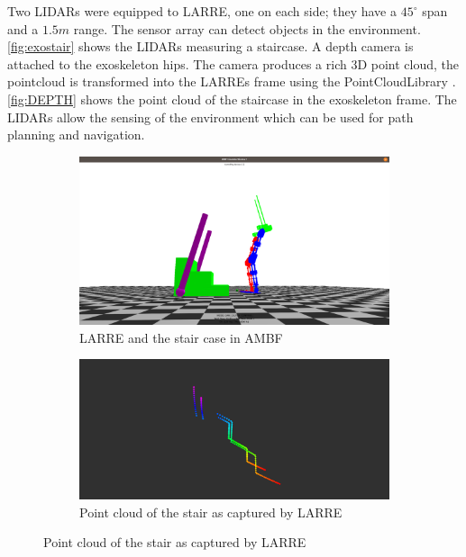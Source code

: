  
 Two LIDARs were equipped to LARRE, one on each side; they have a $45^{\circ}$ span and a $1.5m$ range. The sensor array can detect objects in the environment. \autoref{fig:exostair} shows the LIDARs measuring a staircase. A depth camera is attached to the exoskeleton hips. The camera produces a rich 3D point cloud, the pointcloud is transformed into the LARREs frame using the PointCloudLibrary \cite{Rusu_ICRA2011_PCL}.  \autoref{fig:DEPTH} shows the point cloud of the staircase in the exoskeleton frame. The LIDARs allow the sensing of the environment which can be used for path planning and navigation. 

 \begin{figure}[h]
    \begin{subfigure}{.5\linewidth}
        \centering
        \includegraphics[scale=0.1]{images/sim/stair2.png}
        \caption{LARRE and the stair case in AMBF}
        \label{fig:exostair}
        \label{fig:sub1}
    \end{subfigure}%
    \begin{subfigure}{.5\linewidth}
       \centering
        \includegraphics[scale=0.15]{images/sim/point_cloud_stairs.png}
        \caption[Point Cloud of the Stairs]{Point cloud of the stair as captured by LARRE}
        \label{fig:LIDAR}

\end{subfigure}
\end{figure}
